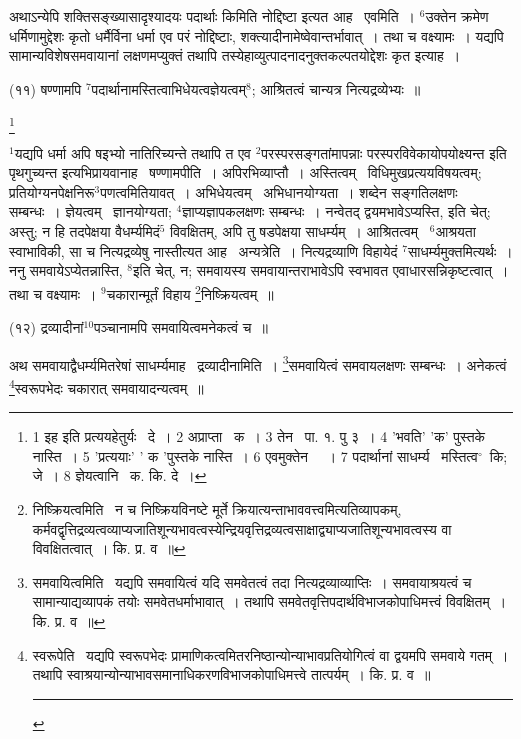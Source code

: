 \documentclass[11pt, openany]{book}
\newcommand\blfootnote[1]{%
 \begingroup
 \renewcommand\thefootnote{}\footnote{#1}%
 \addtocounter{footnote}{-1}%
 \endgroup
}
\begin{document}
अथाऽन्येपि शक्तिसङ्ख्यासादृश्यादयः पदार्थाः किमिति नोद्दिष्टा इत्यत आह \textendash\ एवमिति~। ${}^6$उक्तेन क्रमेण धर्मिणामुद्देशः कृतो धर्मैर्विना धर्मा एव परं नोद्दिष्टाः, शक्त्यादीनामेष्वेवान्तर्भावात्~। तथा च वक्ष्यामः~। यद्यपि सामान्यविशेषसमवायानां लक्षणमप्युक्तं तथापि तस्येहाव्युत्पादनादनुक्तकल्पतयोद्देशः कृत इत्याह~।

\hangindent=2cm {\knu (११) षण्णामपि ${}^7$पदार्थानामस्तित्वाभिधेयत्वज्ञेयत्वम्$^8$; आश्रितत्वं चान्यत्र नित्यद्रव्येभ्यः~॥}

\blfootnote{1 इह इति प्रत्ययहेतुर्यः  \textendash\ दे~। 2 अप्राप्ता  \textendash\ क~। 3 तेन  \textendash\ पा. १. पु ३~। 4 'भवति' 'क' पुस्तके नास्ति~। 5 'प्रत्ययाः' ' क 'पुस्तके नास्ति~। 6 एवमुक्तेन  \textendash\ ~। 7 पदार्थानां साधर्म्य  \textendash\ मस्तित्व$^\circ$\textendash\ कि; जे~। 8 ज्ञेयत्वानि  \textendash\ क. कि. दे~।}

\newpage
\begin{sloppypar}
${}^1$यद्यपि धर्मा अपि षइभ्यो नातिरिच्यन्ते तथापि त एव ${}^2$परस्परसङ्गतांमापन्नाः परस्परविवेकायोपयोक्ष्यन्त इति पृथगुच्यन्त इत्यभिप्रायवानाह \textendash\ {\knu षण्णा}मपीति~। अपिरभिव्याप्तौ~। {\knu अस्ति}त्वम् \textendash\ विधिमुखप्रत्ययविषयत्वम्; प्रतियोग्यनपेक्षनिरू$^3$पणत्वमितियावत्~। {\knu अभिधेयत्व}म् \textendash\ अभिधानयोग्यता~। शब्देन सङ्गतिलक्षणः सम्बन्धः~। {\knu ज्ञेय}त्वम् \textendash\ ज्ञानयोग्यता; ${}^4$ज्ञाप्यज्ञापकलक्षणः सम्बन्धः~। नन्वेतद् द्वयमभावेऽप्यस्ति, इति चेत्; अस्तु; न हि तदपेक्षया वैधर्म्यमिदं$^5$ विवक्षितम्, अपि तु षडपेक्षया साधर्म्यम्~। {\knu आश्रितत्वम्} \textendash\ ${}^6$आश्रयता स्वाभाविकी, सा च नित्यद्रव्येषु नास्तीत्यत आह \textendash\ {\knu अन्य}त्रेति~। नित्यद्रव्याणि विहायेदं ${}^7$साधर्म्यमुक्तमित्यर्थः~। ननु समवायेऽप्येतन्नास्ति, ${}^8$इति चेत्, न; समवायस्य समवायान्तराभावेऽपि स्वभावत एवाधारसन्निकृष्टत्वात्~। तथा च वक्ष्यामः~। ${}^9$चकारान्मूर्तं विहाय \renewcommand{\thefootnote}{१}\footnote{निष्क्रियत्वमिति \textendash\ न च निष्क्रियविनष्टे मूर्ते क्रियात्यन्ताभाववत्त्वमित्यतिव्यापकम्, कर्मवद्वृत्तिद्रव्यत्वव्याप्यजातिशून्यभावत्वस्येन्द्रियवृत्तिद्रव्यत्वसाक्षाद्व्याप्यजातिशून्यभावत्वस्य वा विवक्षितत्वात्~। कि. प्र. व~॥}निष्क्रियत्वम्~॥
\end{sloppypar}

{\knu (१२) द्रव्यादीनां${}^10$पञ्चानामपि समवायित्वमनेकत्वं च~॥}

अथ समवायाद्वैधर्म्यमितरेषां साधर्म्यमाह \textendash\ द्रव्यादीनामिति~। \renewcommand{\thefootnote}{२}\footnote{समवायित्वमिति \textendash\ यद्यपि समवायित्वं यदि समवेतत्वं तदा नित्यद्रव्याव्याप्तिः~। समवायाश्रयत्वं च सामान्याद्यव्यापकं तयोः समवेतधर्माभावात्~। तथापि समवेतवृत्तिपदार्थविभाजकोपाधिमत्त्वं विवक्षितम्~। कि. प्र. व~॥}समवायित्वं समवायलक्षणः सम्बन्धः~। अनेकत्वं \renewcommand{\thefootnote}{३}\footnote{स्वरूपेति \textendash\ यद्यपि स्वरूपभेदः प्रामाणिकत्वमितरनिष्ठान्योन्याभावप्रतियोगित्वं वा द्वयमपि समवाये गतम्~। तथापि स्वाश्रयान्योन्याभावसमानाधिकरणविभाजकोपाधिमत्त्वे तात्पर्यम्~। कि. प्र. व~॥ \rule{0.4\linewidth}{0.5pt}}स्वरूपभेदः चकारात् समवायादन्यत्वम्~॥
\end{document}

